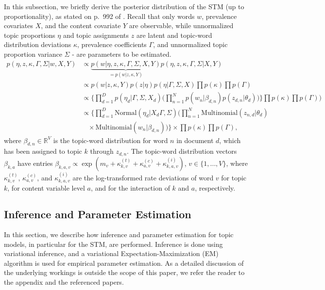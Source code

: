 In this subsection, we briefly derive the posterior distribution of the STM (up to proportionality), as stated on p.\ 992 of \cite{roberts2016model}. Recall that only words $w$, prevalence covariates $X$, and the content covariate $Y$ are observable, while unnormalized topic proportions $\eta$ and topic assignments $z$ are latent and topic-word distribution deviations $\kappa$, prevalence coefficients $\Gamma$, and unnormalized topic proportion variance $\Sigma$ - are parameters to be estimated.
\begin{align*}
p(\eta, z, \kappa, \Gamma, \Sigma | w, X, Y) & \propto \underbrace{p(w | \eta, z, \kappa, \Gamma, \Sigma, X, Y)}_{=p(w | z, \kappa, Y)} p(\eta, z, \kappa, \Gamma, \Sigma | X, Y) \\
& \propto p(w | z, \kappa, Y) p(z | \eta) p(\eta | \Gamma, \Sigma, X) \prod p(\kappa) \prod p(\Gamma) \\
& \propto \Big\{ \prod_{d=1}^{D} p(\eta_d | \Gamma, \Sigma, X_d) \Big( \prod_{n=1}^{N} p(w_n | \beta_{d, n}) p(z_{d,n} | \theta_d) \Big) \Big\} \prod p(\kappa) \prod p(\Gamma)) \\
& \propto \Big\{ \prod_{d=1}^{D} \text{Normal}(\eta_d | X_d \Gamma, \Sigma) \Big( \prod_{n=1}^{N} \text{Multinomial}(z_{n,d}| \theta_d) \\
& \ \ \ \ \times \text{Multinomial}(w_n | \beta_{d,n}) \Big) \Big\} \times \prod p(\kappa) \prod p(\Gamma),
\end{align*}
where $\beta_{d, n} \in \mathbb{R}^V$ is the topic-word distribution for word $n$ in document $d$, which has been assigned to topic $k$ through $z_{d,n}$. The topic-word distribution vectors $\beta_{k,a}$ have entries $\beta_{k,a,v} \propto \exp(m_{v} + \kappa_{k,v}^{(t)} + \kappa_{a,v}^{(c)} + \kappa_{k, a,v}^{(i)})$, $v \in \{1,\dots,V\}$, where $\kappa_{k,v}^{(t)}$, $\kappa_{a,v}^{(c)}$, and $\kappa_{k, a,v}^{(i)}$ are the log-transformed rate deviations of word $v$ for topic $k$, for content variable level $a$, and for the interaction of $k$ and $a$, respectively.

\subsection{Inference and Parameter Estimation}

In this section, we describe how inference and parameter estimation for topic models, in particular for the STM, are performed. Inference is done using variational inference, and a variational Expectation-Maximization (EM) algorithm is used for empirical parameter estimation. As a detailed discussion of the underlying workings is outside the scope of this paper, we refer the reader to the appendix and the referenced papers.

